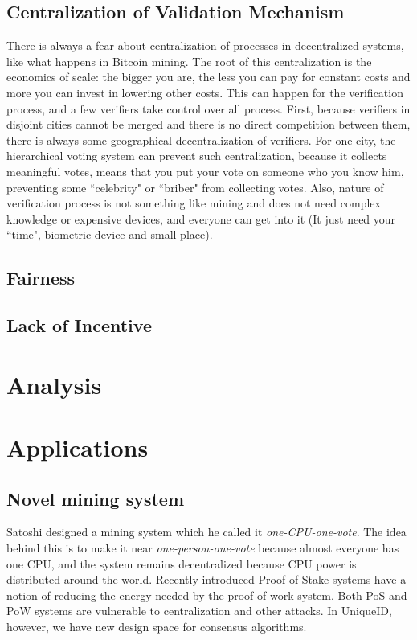 \documentclass[conference]{IEEEtran}
\begin{document}
\subsection{Centralization of Validation Mechanism}
There is always a fear about centralization of processes in decentralized systems, like what happens in Bitcoin mining. The root of this centralization is the economics of scale: the bigger you are, the less you can pay for constant costs and more you can invest in lowering other costs. This can happen for the verification process, and a few verifiers take control over all process. First, because verifiers in disjoint cities cannot be merged and there is no direct competition between them, there is always some geographical decentralization of verifiers. For one city, the hierarchical voting system can prevent such centralization, because it collects meaningful votes, means that you put your vote on someone who you know him, preventing some ``celebrity" or ``briber" from collecting votes. Also, nature of verification process is not something like mining and does not need complex knowledge or expensive devices, and everyone can get into it (It just need your ``time", biometric device and small place). 

\subsection{Fairness}
\subsection{Lack of Incentive}


\section{Analysis}

 
\section{Applications}

\subsection{Novel mining system}
Satoshi designed a mining system which he called it \textit{one-CPU-one-vote}. The idea behind this is to make it near \textit{one-person-one-vote} because almost everyone has one CPU, and the system remains decentralized because CPU power is distributed around the world. Recently introduced Proof-of-Stake systems have a notion of reducing the energy needed by the proof-of-work system. Both PoS and PoW systems are vulnerable to centralization and other attacks. In UniqueID, however, we have new design space for consensus algorithms.
\end{document}
